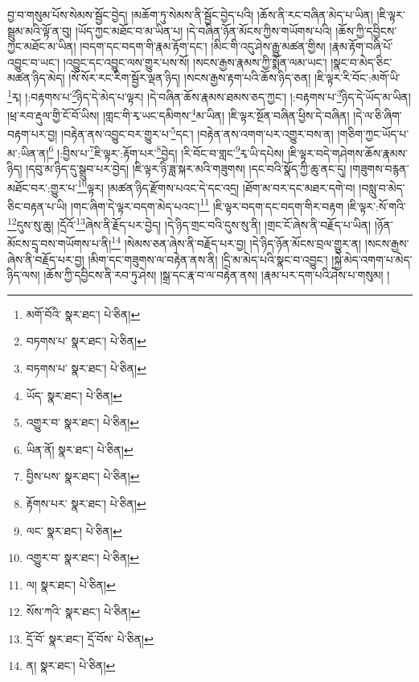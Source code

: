 བྱ་བ་གསུམ་པོས་སེམས་སྦྱོང་བྱེད། །མཆོག་ཏུ་སེམས་ནི་སྦྱོང་བྱེད་པའི། །ཆོས་ནི་རང་བཞིན་མེད་པ་ཡིན། །ཇི་ལྟར་སྦྲུམ་མའི་ལྟོ་ན་བུ། །ཡོད་ཀྱང་མཐོང་བ་མ་ཡིན་པ། །དེ་བཞིན་ཉོན་མོངས་ཀྱིས་གཡོགས་པའི། །ཆོས་ཀྱི་དབྱིངས་ཀྱང་མཐོང་མ་ཡིན། །བདག་དང་བདག་གི་རྣམ་རྟོག་དང་། །མིང་གི་འདུ་ཤེས་རྒྱུ་མཚན་གྱིས། །རྣམ་རྟོག་བཞི་པོ་འབྱུང་བ་ཡང་། །འབྱུང་དང་འབྱུང་ལས་གྱུར་པས་སོ། །སངས་རྒྱས་རྣམས་ཀྱི་སྨོན་ལམ་ཡང་། །སྣང་བ་མེད་ཅིང་མཚན་ཉིད་མེད། །སོ་སོར་རང་རིག་སྦྱོར་ལྡན་ཉིད། །སངས་རྒྱས་རྟག་པའི་ཆོས་ཉིད་ཅན། །ཇི་ལྟར་རི་བོང་:མགོ་ཡི་\footnote{མགོ་བོའི་  སྣར་ཐང་།  པེ་ཅིན། }རྭ། །:བརྟགས་པ་\footnote{བཏགས་པ་  སྣར་ཐང་།  པེ་ཅིན། }ཉིད་དེ་མེད་པ་ལྟར། །དེ་བཞིན་ཆོས་རྣམས་ཐམས་ཅད་ཀྱང་། །:བརྟགས་པ་\footnote{བཏགས་པ་  སྣར་ཐང་།  པེ་ཅིན། }ཉིད་དེ་ཡོད་མ་ཡིན། །ཕྲ་རབ་རྡུལ་གྱི་ངོ་བོ་ཡིས། །གླང་གི་རྭ་ཡང་དམིགས་\footnote{ཡོད་  སྣར་ཐང་།  པེ་ཅིན། }མ་ཡིན། །ཇི་ལྟར་སྔོན་བཞིན་ཕྱིས་དེ་བཞིན། །དེ་ལ་ཅི་ཞིག་བརྟག་པར་བྱ། །བརྟེན་ནས་འབྱུང་བར་གྱུར་པ་\footnote{འགྱུར་བ་  སྣར་ཐང་།  པེ་ཅིན། }དང་། །བརྟེན་ནས་འགག་པར་འགྱུར་བས་ན། །གཅིག་ཀྱང་ཡོད་པ་མ་:ཡིན་ན།\footnote{ཡིན་ནོ།  སྣར་ཐང་།  པེ་ཅིན། } །:བྱིས་པ་\footnote{བྱིས་པས་  སྣར་ཐང་།  པེ་ཅིན། }ཇི་ལྟར་:རྟོག་པར་\footnote{རྟོགས་པར་  སྣར་ཐང་།  པེ་ཅིན། }བྱེད། །རི་བོང་བ་གླང་\footnote{ལང་  སྣར་ཐང་།  པེ་ཅིན། }རྭ་ཡི་དཔེས། །ཇི་ལྟར་བདེ་གཤེགས་ཆོས་རྣམས་ཉིད། །དབུ་མ་ཉིད་དུ་སྒྲུབ་པར་བྱེད། །ཇི་ལྟར་ཉི་ཟླ་སྐར་མའི་གཟུགས། །དང་བའི་སྣོད་ཀྱི་ཆུ་ནང་དུ། །གཟུགས་བརྙན་མཐོང་བར་:གྱུར་པ་\footnote{འགྱུར་བ་  སྣར་ཐང་།  པེ་ཅིན། }ལྟར། །མཚན་ཉིད་རྫོགས་པའང་དེ་དང་འདྲ། །ཐོག་མ་བར་དང་མཐར་དགེ་བ། །བསླུ་བ་མེད་ཅིང་བརྟན་པ་ཡི། །གང་ཞིག་དེ་ལྟར་བདག་མེད་པའང་།\footnote{ལ།  སྣར་ཐང་།  པེ་ཅིན། } །ཇི་ལྟར་བདག་དང་བདག་གིར་བརྟག །ཇི་ལྟར་:སོ་གའི་\footnote{སོས་ཀའི་  སྣར་ཐང་།  པེ་ཅིན། }དུས་སུ་ཆུ། །དྲོའོ་\footnote{དྲོ་བོ་  སྣར་ཐང་། དྲོ་བོས་  པེ་ཅིན། }ཞེས་ནི་རྗོད་པར་བྱེད། །དེ་ཉིད་གྲང་བའི་དུས་སུ་ནི། །གྲང་ངོ་ཞེས་ནི་བརྗོད་པ་ཡིན། །ཉོན་མོངས་དྲྭ་བས་གཡོགས་པ་ནི།\footnote{ན།  སྣར་ཐང་།  པེ་ཅིན། } །སེམས་ཅན་ཞེས་ནི་བརྗོད་པར་བྱ། །དེ་ཉིད་ཉོན་མོངས་བྲལ་གྱུར་ན། །སངས་རྒྱས་ཞེས་ནི་བརྗོད་པར་བྱ། །མིག་དང་གཟུགས་ལ་བརྟེན་ནས་ནི། །དྲི་མ་མེད་པའི་སྣང་བ་འབྱུང་། །སྐྱེ་མེད་འགག་པ་མེད་ཉིད་ལས། །ཆོས་ཀྱི་དབྱིངས་ནི་རབ་ཏུ་ཤེས། །སྒྲ་དང་རྣ་བ་ལ་བརྟེན་ནས། །རྣམ་པར་དག་པའི་ཤེས་པ་གསུམ། །
